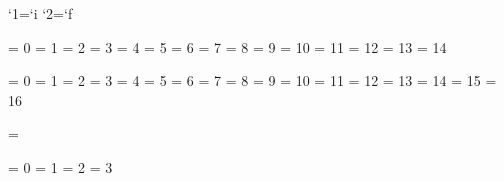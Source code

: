 \bgroup %

  \uccode`1=`i \uccode`2=`f \uppercase{\gdef\if@12{}}

\egroup


\newif\ifdone



\chardef\@@escape      =  0
\chardef\@@begingroup  =  1
\chardef\@@endgroup    =  2
\chardef\@@mathshift   =  3
\chardef\@@alignment   =  4
\chardef\@@endofline   =  5
\chardef\@@parameter   =  6
\chardef\@@superscript =  7
\chardef\@@subscript   =  8
\chardef\@@ignore      =  9
\chardef\@@space       = 10
\chardef\@@letter      = 11
\chardef\@@other       = 12
\chardef\@@active      = 13
\chardef\@@comment     = 14


\chardef\@@bottomlevelgroup   =  0
\chardef\@@simplegroup        =  1
\chardef\@@hboxgroup          =  2
\chardef\@@adjustedhboxgroup  =  3
\chardef\@@vboxgroup          =  4
\chardef\@@vtopgroup          =  5
\chardef\@@aligngroup         =  6
\chardef\@@noaligngroup       =  7
\chardef\@@outputgroup        =  8
\chardef\@@mathgroup          =  9
\chardef\@@discretionarygroup = 10
\chardef\@@insertgroup        = 11
\chardef\@@vcentergroup       = 12
\chardef\@@mathchoicegroup    = 13
\chardef\@@semisimplegroup    = 14
\chardef\@@mathshiftgroup     = 15
\chardef\@@mathleftgroup      = 16

\chardef\@@vadjustgroup       = \@@insertgroup


\chardef\@@batchmode     = 0
\chardef\@@nonstopmode   = 1
\chardef\@@scrollmode    = 2
\chardef\@@errorstopmode = 3


